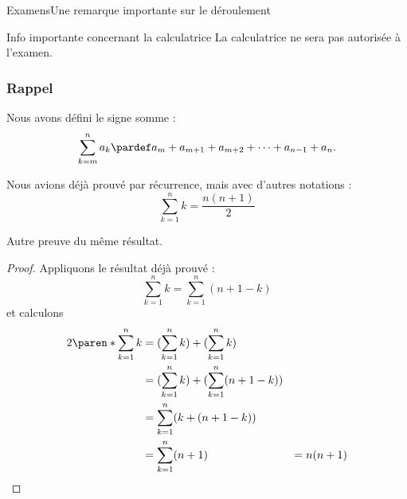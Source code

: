 \begin{frame}{Examens}{Une remarque importante sur le déroulement}
  \begin{block}{Info importante concernant la calculatrice}
    La calculatrice ne sera pas autorisée à l'examen.
  \end{block}
\end{frame}
\begin{frame}
  \frametitle{Rappel}
  Nous avons défini le signe somme :
  \begin{equation*}
    \sum_{k = m}^{n} a_{k} \pardef a_{m} + a_{m+1} + a_{m+2} + \cdots + a_{n-1} + a_{n}.
  \end{equation*}

  \begin{example}
    Nous avions déjà prouvé par récurrence, mais avec d'autres notations :
    \begin{equation*}
      \sum_{k=1}^{n} k = \frac{n(n+1)}{2}
    \end{equation*}
  \end{example}
\end{frame}
\begin{frame}
  Autre preuve du même résultat.
  \begin{proof}
    Appliquons le résultat déjà prouvé :
    \begin{equation*}
      \sum_{k=1}^{n} k = \sum_{k=1}^{n} (n+1-k)
    \end{equation*}
    et calculons
    \begin{align*}
      2 \paren*{\sum_{k=1}^{n} k} &= (\sum_{k=1}^{n} k) + (\sum_{k=1}^{n} k) \\
                                  &= (\sum_{k=1}^{n} k) + (\sum_{k=1}^{n} (n+1-k)) \\
                                  &= \sum_{k=1}^{n} (k+(n+1-k)) \\
                                  &= \sum_{k=1}^{n} (n+1) &= n (n+1)
    \end{align*}
  \end{proof}
\end{frame}

